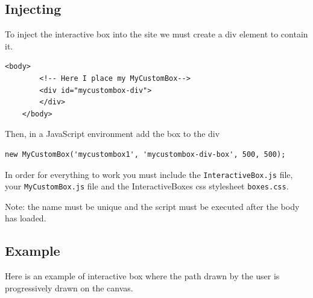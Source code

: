 \documentclass{article}
\begin{document}
\subsection{Injecting}

To inject the interactive box into the site we must create a div element to contain it.

\begin{lstlisting}[style=html]
    <body>
        <!-- Here I place my MyCustomBox-->
        <div id="mycustombox-div">
        </div>
    </body>
\end{lstlisting}

Then, in a JavaScript environment add the box to the div

\begin{lstlisting}[style=js]
    new MyCustomBox('mycustombox1', 'mycustombox-div-box', 500, 500);
\end{lstlisting}

In order for everything to work you must include the \texttt{InteractiveBox.js} file, your \texttt{MyCustomBox.js}
file and the InteractiveBoxes css stylesheet \texttt{boxes.css}.

Note: the name must be unique and the script must be executed after the body has loaded.

\pagebreak

\subsection{Example}

Here is an example of interactive box where the path drawn by the user is progressively drawn on the canvas.
\end{document}
